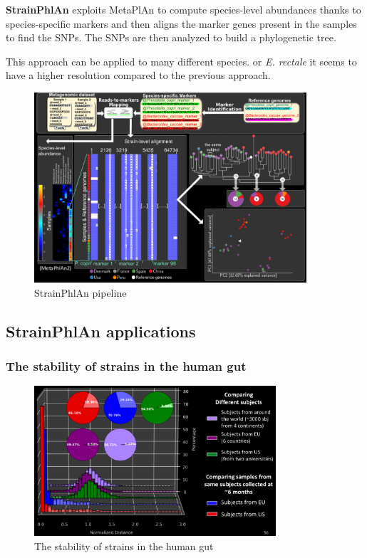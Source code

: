\textbf{StrainPhlAn} exploits MetaPlAn to compute species-level abundances thanks to species-specific markers and then aligns the marker genes present in the samples to find the SNPs. The SNPs are then analyzed to build a phylogenetic tree.

This approach can be applied to many different species. or \emph{E. rectale} it seems to have a higher resolution compared to the previous approach.

\begin{figure}[!h]
\centering
\includegraphics[width=0.9\textwidth]{StrainPhlAn.png}
\caption{\label{fig:strainphlan}StrainPhlAn pipeline}
\end{figure}

\subsection{StrainPhlAn applications}

\subsubsection{The stability of strains in the human gut}

\begin{figure}[!h]
\centering
\includegraphics[width=0.8\textwidth]{strainGut.png}
\caption{\label{fig:gut}The stability of strains in the human gut}
\end{figure}

